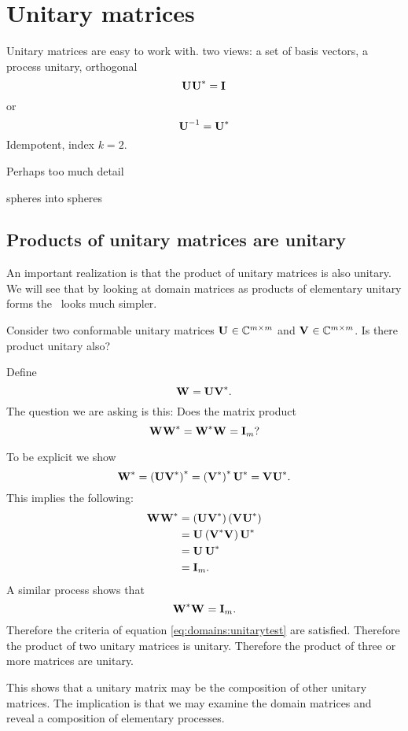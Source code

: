\section{Unitary matrices}

Unitary matrices are easy to work with.
two views: a set of basis vectors, a process
unitary, orthogonal
\begin{equation}
  \textbf{U}^{\mathrm{}}\textbf{U}^{\mathrm{*}} = \textbf{I}_{}
\end{equation}
or
\begin{equation}
  \textbf{U}^{\mathrm{-1}} = \textbf{U}^{\mathrm{*}}
\end{equation}
Idempotent, index $k=2$.

Perhaps too much detail

spheres into spheres

\subsection[Products of unitary matrices]{Products of unitary matrices are unitary}

An important realization is that the product of unitary matrices is also unitary. We will see that by looking at domain matrices as products of elementary unitary forms the \svdp \ looks much simpler.

Consider two conformable unitary matrices $\textbf{U}^{\mathrm{}}\in\mathbb{C}^{m\times m}$ and $\textbf{V}^{\mathrm{}}\in\mathbb{C}^{m\times m}$. Is there product unitary also?

Define
\begin{equation}
  \textbf{W}_{\mathrm{}} = \textbf{U}^{\mathrm{}}\textbf{V}^{\mathrm{*}}.
\end{equation}
The question we are asking is this: Does the matrix product
\begin{equation}
  \textbf{W}_{\mathrm{}}\textbf{W}_{\mathrm{}}^{*} = \textbf{W}_{\mathrm{}}^{*}\textbf{W}_{\mathrm{}} = \textbf{I}_{m}?
  \label{eq:domains:unitarytest}
\end{equation}

To be explicit we show
\begin{equation}
  \textbf{W}_{\mathrm{}}^{*}= \left( \textbf{U}^{\mathrm{}}\textbf{V}^{\mathrm{*}} \right)^{*} = \left( \textbf{V}^{\mathrm{*}} \right)^{*}\textbf{U}^{\mathrm{*}} = \textbf{V}^{\mathrm{}}\textbf{U}^{\mathrm{*}}.
\end{equation}
This implies the following:
\begin{equation}
  \begin{split}
    \textbf{W}_{\mathrm{}}\textbf{W}_{\mathrm{}}^{*} &= \left( \textbf{U}^{\mathrm{}}\textbf{V}^{\mathrm{*}} \right)\left( \textbf{V}^{\mathrm{}}\textbf{U}^{\mathrm{*}} \right)\\
      &=\textbf{U}^{\mathrm{}} \left( \textbf{V}^{\mathrm{*}}\textbf{V}^{\mathrm{}} \right) \textbf{U}^{\mathrm{*}}\\
      &= \textbf{U}^{\mathrm{}}\,\textbf{U}^{\mathrm{*}}\\
      &= \textbf{I}_{m}.
  \end{split}
\end{equation}
A similar process shows that
\begin{equation}
  \textbf{W}_{\mathrm{}}^{*}\textbf{W}_{\mathrm{}} = \textbf{I}_{m}.
\end{equation}
Therefore the criteria of equation \eqref{eq:domains:unitarytest} are satisfied. Therefore the product of two unitary matrices is unitary. Therefore the product of three or more matrices are unitary.

This shows that a unitary matrix may be the composition of other unitary matrices. The implication is that we may examine the domain matrices and reveal a composition of elementary processes.

\endinput